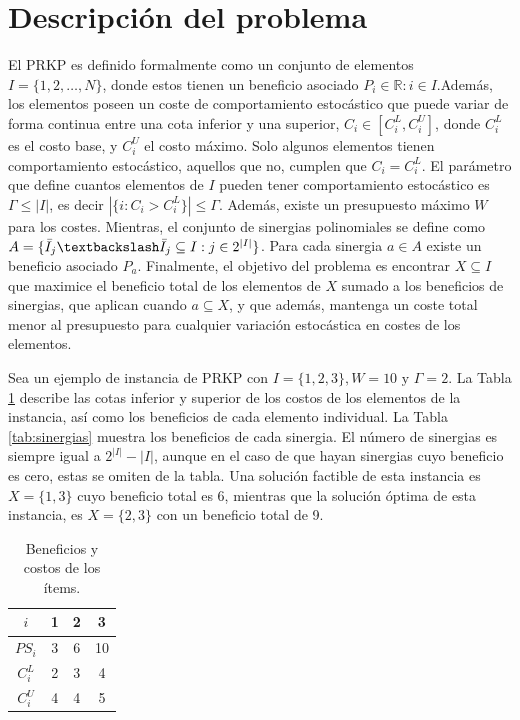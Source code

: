 \documentclass[spanish, a4paper, 12pt, openany,final]{book}
\begin{document}
\section{Descripción del problema}
	El PRKP es definido formalmente como un conjunto de elementos $I = \{1,2,\hdots,N\}$, donde estos tienen un beneficio asociado $P_i \in \mathbb{R}:i\in I$.Además, los elementos poseen un coste de comportamiento estocástico que puede variar de forma continua entre una cota inferior y una superior, $C_i \in [C^L_i,C^U_i]$, donde $C^L_i$ es el costo base, y $C^U_i$ el costo máximo. Solo algunos elementos tienen comportamiento estocástico, aquellos que no, cumplen que $C_i = C^L_i$. El parámetro que define cuantos elementos de $I$ pueden tener comportamiento estocástico es $\Gamma \leq |I|$, es decir $|\{i: C_i > C^L_i\}| \leq \Gamma$. Además, existe un presupuesto máximo $W$ para los costes. Mientras, el conjunto de sinergias polinomiales se define como $A = \{ \bar{I}_j \textbackslash \bar{I}_j \subseteq I: j \in 2^{|I|}\}$. Para cada sinergia $a \in A$ existe un beneficio asociado $P_a$. Finalmente, el objetivo del problema es encontrar $X \subseteq I$ que maximice el beneficio total de los elementos de $X$ sumado a los beneficios de sinergias, que aplican cuando $a \subseteq X$, y que además, mantenga un coste total menor al presupuesto para cualquier variación estocástica en costes de los elementos.
	
	Sea un ejemplo de instancia de PRKP con $I =\{1,2,3\},W = 10 \text{ y } \Gamma = 2$. La Tabla \ref{tab:example_p} describe las cotas inferior y superior de los costos de los elementos de la instancia, así como los beneficios de cada elemento individual. La Tabla \ref{tab:sinergias} muestra los beneficios de cada sinergia. El número de sinergias es siempre igual a $2^|I| - |I|$, aunque en el caso de que hayan sinergias cuyo beneficio es cero, estas se omiten de la tabla.	Una solución factible de esta instancia es $X = \{1,3\}$ cuyo beneficio total es 6, mientras que la solución óptima de esta instancia, es $X = \{2,3\}$ con un beneficio total de 9.
	
	\begin{table}[H]
		\centering
		
		\caption{Beneficios y costos de los ítems.}
		\label{tab:example_p}
	\begin{tabular}{|c|c|c|c|}
		\hline
		$i$ & 1 & 2 & 3 \\
		\hline
		$PS_i$ & 3 & 6 & 10 \\
		\hline
		$C^L_i$ & 2 & 3 & 4 \\
		\hline
		$C^U_i$ & 4 & 4 & 5 \\
		\hline
	\end{tabular}
	
	\end{table}
	
\end{document}
